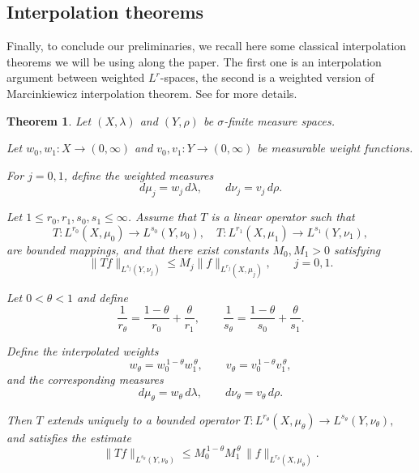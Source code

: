 \documentclass[12pt, reqno]{amsart}
\newtheorem{teo}[defi]{Theorem}
\newcommand{\1}{\mathds{1}}
\begin{document}
\subsection{Interpolation theorems} Finally, to conclude our preliminaries, we recall here some classical interpolation theorems we will be using along the paper. The first one is an interpolation argument between weighted $L^r$-spaces, the second is a weighted version of Marcinkiewicz interpolation theorem. See \cite{Stein1971, Stein1958} for more details.


\begin{teo}\label{teoSteinWeiss}
Let $(X,\lambda)$ and $(Y,\rho)$ be $\sigma$-finite measure spaces.

Let $w_0,w_1 : X \to (0,\infty)$ and $v_0,v_1 : Y \to (0,\infty)$ be measurable
weight functions.

For $j=0,1$, define the weighted measures
\[
d\mu_j = w_j\, d\lambda,
\qquad
d\nu_j = v_j\, d\rho.
\]

Let $1 \le r_0,r_1,s_0,s_1 \le \infty$.  Assume that $T$ is a linear operator such that
\[
T :
L^{r_0}(X,\mu_0)
\longrightarrow
L^{s_0}(Y,\nu_0), \quad 
T :
L^{r_1}(X,\mu_1)
\longrightarrow
L^{s_1}(Y,\nu_1),
\]
are bounded mappings, and that there exist constants $M_0,M_1>0$ satisfying
\[
\|Tf\|_{L^{s_j}(Y,\nu_j)}
\le
M_j
\|f\|_{L^{r_j}(X,\mu_j)},
\qquad j=0,1.
\]

Let $0<\theta<1$ and define
\[
\frac1{r_\theta}
=
\frac{1-\theta}{r_0}
+
\frac{\theta}{r_1},
\qquad
\frac1{s_\theta}
=
\frac{1-\theta}{s_0}
+
\frac{\theta}{s_1}.
\]

Define the interpolated weights
\[
w_\theta
=
w_0^{\,1-\theta}
w_1^{\,\theta},
\qquad
v_\theta
=
v_0^{\,1-\theta}
v_1^{\,\theta},
\]
and the corresponding measures
\[
d\mu_\theta = w_\theta\, d\lambda,
\qquad
d\nu_\theta = v_\theta\, d\rho.
\]

Then $T$ extends uniquely to a bounded operator $T :
L^{r_\theta}(X,\mu_\theta)
\rightarrow
L^{s_\theta}(Y,\nu_\theta),$ and satisfies the estimate
\[
\|Tf\|_{L^{s_\theta}(Y,\nu_\theta)}
\le
M_0^{\,1-\theta}
M_1^{\,\theta}
\,
\|f\|_{L^{r_\theta}(X,\mu_\theta)}.
\]
\end{teo}
\end{document}
